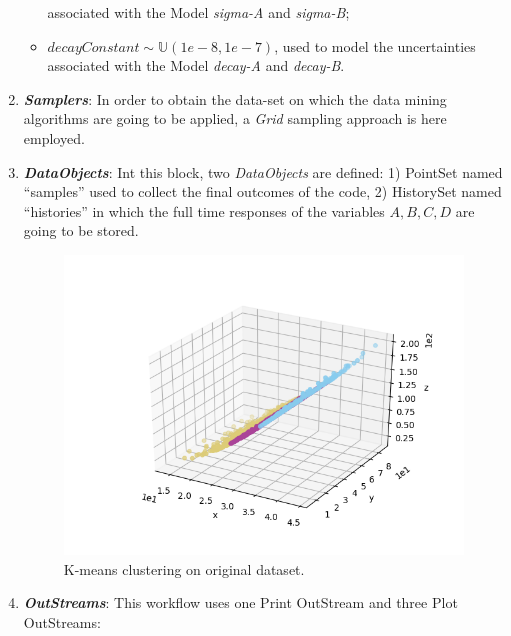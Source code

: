 \begin{enumerate}
\begin{itemize}
    associated with  the Model \textit{sigma-A} and \textit{sigma-B};
    \item  $decayConstant \sim \mathbb{U}(1e-8,1e-7)$,  used to
    model the uncertainties
    associated with  the Model \textit{decay-A} and \textit{decay-B}.
  \end{itemize}
   \item \textbf{\textit{Samplers}}:
  In order to obtain the data-set on which the data mining algorithms are going to be applied, a \textit{Grid} sampling approach is here employed.
   \item \textbf{\textit{DataObjects}}:
  Int this block, two \textit{DataObjects} are defined:
  1) PointSet named ``samples'' used to collect the final outcomes of
  the code,
  2) HistorySet named ``histories'' in which the full time responses of the
  variables $A,B,C,D$ are going to be stored.
 \begin{figure}[h!]
  \centering
  \includegraphics[scale=0.7]{../../tests/framework/user_guide/DataMining/gold/dataMiningAnalysis/1-PlotLabels_dataMining.png}
  \caption{K-means clustering on original dataset.}
  \label{fig:KmeanOrigData}
 \end{figure}
   \item \textbf{\textit{OutStreams}}:
     This workflow uses one Print OutStream and three Plot OutStreams:
     \begin{itemize}

\end{itemize}
\end{enumerate}
